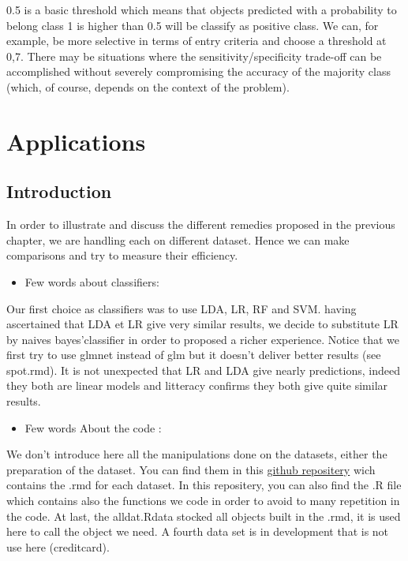 \documentclass[
]{report}
\providecommand{\tightlist}{%
  \setlength{\itemsep}{0pt}\setlength{\parskip}{0pt}}
\begin{document}
0.5 is a basic threshold which means that objects predicted with a probability to belong class 1 is higher than 0.5 will be classify as positive class. We can, for example, be more selective in terms of entry criteria and choose a threshold at 0,7.
There may be situations where the sensitivity/speciﬁcity trade-oﬀ can be accomplished without severely compromising the accuracy of the majority class (which, of course, depends on the context of the problem).

\hypertarget{applications}{%
\chapter{Applications}\label{applications}}

\hypertarget{introduction-1}{%
\section{Introduction}\label{introduction-1}}

In order to illustrate and discuss the different remedies proposed in the previous chapter, we are handling each on different dataset. Hence we can make comparisons and try to measure their efficiency.

\begin{itemize}
\tightlist
\item
  Few words about classifiers:
\end{itemize}

Our first choice as classifiers was to use LDA, LR, RF and SVM. having ascertained that LDA et LR give very similar results, we decide to substitute LR by naives bayes'classifier in order to proposed a richer experience. Notice that we first try to use glmnet instead of glm but it doesn't deliver better results (see spot.rmd). It is not unexpected that LR and LDA give nearly predictions, indeed they both are linear models and litteracy confirms they both give quite similar results.

\begin{itemize}
\tightlist
\item
  Few words About the code :
\end{itemize}

We don't introduce here all the manipulations done on the datasets, either the preparation of the dataset. You can find them in this \href{https://github.com/arkansoap/Memoire-M1}{github repositery} wich contains the .rmd for each dataset. In this repositery, you can also find the .R file which contains also the functions we code in order to avoid to many repetition in the code. At last, the alldat.Rdata stocked all objects built in the .rmd, it is used here to call the object we need. A fourth data set is in development that is not use here (creditcard).
\end{document}
